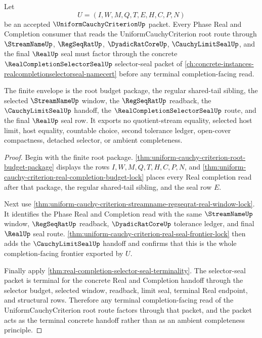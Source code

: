 \begin{theorem}
\label{thm:uniform-cauchy-criterion-real-completion-finite-budget-envelope}
Let
$$
U=(I,W,M,Q,T,E,H,C,P,N)
$$
be an accepted $\UniformCauchyCriterionUp$ packet. Every Phase Real and Completion consumer that reads the UniformCauchyCriterion root route through $\StreamNameUp$, $\RegSeqRatUp$, $\DyadicRatCoreUp$, $\CauchyLimitSealUp$, and the final $\RealUp$ seal must factor through the concrete $\RealCompletionSelectorSealUp$ selector-seal packet of \autoref{ch:concrete-instances-realcompletionselectorseal-namecert} before any terminal completion-facing read.

The finite envelope is the root budget package, the regular shared-tail sibling, the selected $\StreamNameUp$ window, the $\RegSeqRatUp$ readback, the $\CauchyLimitSealUp$ handoff, the $\RealCompletionSelectorSealUp$ route, and the final $\RealUp$ seal row. It exports no quotient-stream equality, selected host limit, host equality, countable choice, second tolerance ledger, open-cover compactness, detached selector, or ambient completeness.
\end{theorem}
\begin{proof}
Begin with the finite root package. \autoref{thm:uniform-cauchy-criterion-root-budget-package} displays the rows $I,W,M,Q,T,H,C,P,N$, and \autoref{thm:uniform-cauchy-criterion-real-completion-budget-lock} places every Real completion read after that package, the regular shared-tail sibling, and the seal row $E$.

Next use \autoref{thm:uniform-cauchy-criterion-streamname-regseqrat-real-window-lock}. It identifies the Phase Real and Completion read with the same $\StreamNameUp$ window, $\RegSeqRatUp$ readback, $\DyadicRatCoreUp$ tolerance ledger, and final $\RealUp$ seal route. \autoref{thm:uniform-cauchy-criterion-real-seal-frontier-lock} then adds the $\CauchyLimitSealUp$ handoff and confirms that this is the whole completion-facing frontier exported by $U$.

Finally apply \autoref{thm:real-completion-selector-seal-terminality}. The selector-seal packet is terminal for the concrete Real and Completion handoff through the selector budget, selected window, readback, limit seal, terminal Real endpoint, and structural rows. Therefore any terminal completion-facing read of the UniformCauchyCriterion root route factors through that packet, and the packet acts as the terminal concrete handoff rather than as an ambient completeness principle.
\end{proof}

